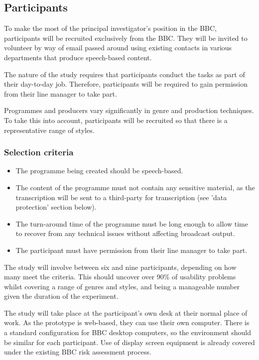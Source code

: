 \subsection{Participants}
To make the most of the principal investigator's position in the BBC,
participants will be recruited exclusively from the BBC. They will be invited
to volunteer by way of email passed around using existing contacts in various
departments that produce speech-based content. 

The nature of the study requires that participants conduct the tasks as part of
their day-to-day job. Therefore, participants will be required to gain
permission from their line manager to take part.

Programmes and producers vary significantly in genre and production techniques.
To take this into account, participants will be recruited so that there is a
representative range of styles.

\subsubsection{Selection criteria}

\begin{itemize}
\item The programme being created should be speech-based.
\item The content of the programme must not contain any sensitive material, as
the transcription will be sent to a third-party for transcription (see 'data
protection' section below).
\item The turn-around time of the programme must be long enough to allow time
to recover from any technical issues without affecting broadcast output.
\item The participant must have permission from their line manager to take part.
\end{itemize}

The study will involve between six and nine participants, depending on how many
meet the criteria. This should uncover over 90\% of usability problems
\citep{Nielsen1993} whilst covering a range of genres and styles, and being a
manageable number given the duration of the experiment.

The study will take place at the participant's own desk at their normal place
of work. As the prototype is web-based, they can use their own computer. There
is a standard configuration for BBC desktop computers, so the environment
should be similar for each participant. Use of display screen equipment is
already covered under the existing BBC risk assessment process.

